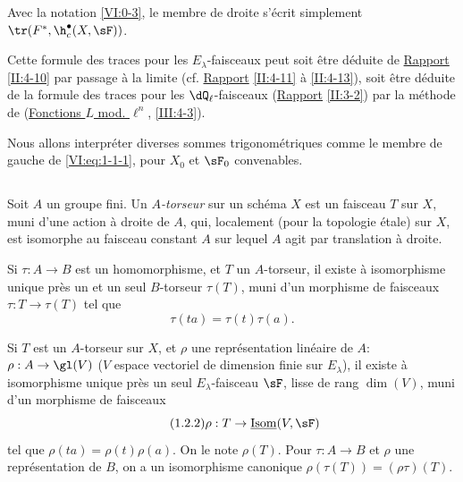 Avec la notation \ref{VI:0-3}, le membre de droite s'écrit simplement 
$\tr(F^\ast,\h_c^\bullet(X,\sF))$. 

Cette formule des traces pour les $E_\lambda$-faisceaux peut soit être 
déduite de \hyperref[II]{Rapport} \ref{II:4-10} par passage à la limite (cf. 
\hyperref[II]{Rapport} \ref{II:4-11} à \ref{II:4-13}), soit être déduite 
de la formule des traces pour les $\dQ_\ell$-faisceaux (\hyperref[II]{Rapport} 
\ref{II:3-2}) par la méthode de (\hyperref[III]{Fonctions $L$ mod. $\ell^n$}, 
\ref{III:4-3}). 

Nous allons interpréter diverses sommes trigonométriques comme le membre de 
gauche de \eqref{VI:eq:1-1-1}, pour $X_0$ et $\sF_0$ convenables. 





\subsection{}\label{VI:1-2}

Soit $A$ un groupe fini. Un \emph{$A$-torseur} sur un schéma $X$ est un 
faisceau $T$ sur $X$, muni d'une action à droite de $A$, qui, localement 
(pour la topologie étale) sur $X$, est isomorphe au faisceau constant $A$ sur 
lequel $A$ agit par translation à droite. 

Si $\tau:A\to B$ est un homomorphisme, et $T$ un $A$-torseur, il existe à 
isomorphisme unique près un et un seul $B$-torseur $\tau(T)$, muni d'un 
morphisme de faisceaux $\tau:T\to \tau(T)$ tel que 
\begin{equation*}\tag{1.2.1}\label{VI:eq:1-2-1}
  \tau(t a) = \tau(t) \tau(a)\text{.}
\end{equation*}

Si $T$ est un $A$-torseur sur $X$, et $\rho$ une représentation linéaire 
de $A$: $\rho:A\to \gl(V)$ ($V$ espace vectoriel de dimension finie sur 
$E_\lambda$), il existe à isomorphisme unique près un seul 
$E_\lambda$-faisceau $\sF$, lisse de rang $\dim(V)$, muni d'un morphisme de 
faisceaux 
\begin{equation*}\tag{1.2.2}\label{VI:eq:1-2-2}
  \rho:T\to \underline{\operatorname{Isom}}(V,\sF)
\end{equation*}
tel que $\rho(t a) = \rho(t) \rho(a)$. On le note $\rho(T)$. Pour 
$\tau:A\to B$ et $\rho$ une représentation de $B$, on a un isomorphisme 
canonique $\rho(\tau(T)) = (\rho\tau)(T)$. 

